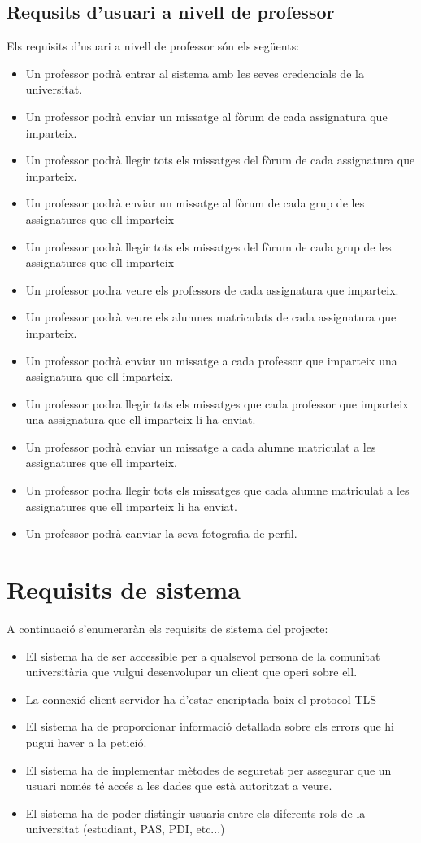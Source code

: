\subsection{Requsits d'usuari a nivell de professor}
Els requisits d'usuari a nivell de professor són els següents:
\begin{itemize}
	\item Un professor podrà entrar al sistema amb les seves credencials de la universitat.
	\item Un professor podrà enviar un missatge al fòrum de cada assignatura que imparteix.
	\item Un professor podrà llegir tots els missatges del fòrum de cada assignatura que imparteix.
	\item Un professor podrà enviar un missatge al fòrum de cada grup de les assignatures que ell imparteix
	\item Un professor podrà llegir tots els missatges del fòrum de cada grup de les assignatures que ell imparteix
	\item Un professor podra veure els professors de cada assignatura que imparteix.
	\item Un professor podrà veure els alumnes matriculats de cada assignatura que imparteix.
	\item Un professor podrà enviar un missatge a cada professor que imparteix una assignatura que ell imparteix.
	\item Un professor podra llegir tots els missatges que cada professor que imparteix una assignatura que ell imparteix li ha enviat.
	\item Un professor podrà enviar un missatge a cada alumne matriculat a les assignatures que ell imparteix.
	\item Un professor podra llegir tots els missatges que cada alumne matriculat a les assignatures que ell imparteix li ha enviat.
	\item Un professor podrà canviar la seva fotografia de perfil.
\end{itemize}
\section{Requisits de sistema}
A continuació s'enumeraràn els requisits de sistema del projecte:
\begin{itemize}
	\item El sistema ha de ser accessible per a qualsevol persona de la comunitat universitària que vulgui desenvolupar un client que operi sobre ell.
	\item La connexió client-servidor ha d'estar encriptada baix el protocol \ac{TLS}
	\item El sistema ha de proporcionar informació detallada sobre els errors que hi pugui haver a la petició.
	\item El sistema ha de implementar mètodes de seguretat per assegurar que un usuari només té accés a les dades que està autoritzat a veure.
	\item El sistema ha de poder distingir usuaris entre els diferents rols de la universitat (estudiant, \ac{PAS}, \ac{PDI}, etc...)
\end{itemize}

